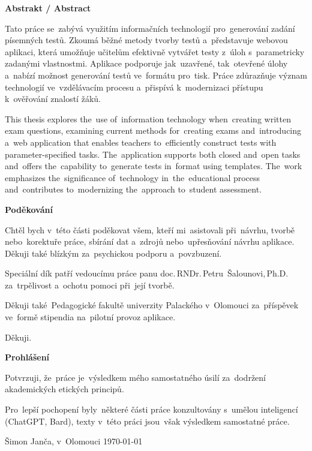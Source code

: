 \documentclass[11pt,a4paper]{report}
\newenvironment{singletonpage}[1]{
    \thispagestyle{empty} %
    \setlength{\parskip}{10pt} %
    \setlength{\parindent}{0pt}
    \vspace*{\stretch{1}} %
    \begin{center}      %
        \textbf{\Huge #1}\\[.4cm]
    \end{center}
}{
    \vspace*{\stretch{3}} %
    \clearpage          %
}
\begin{document}
    \begin{singletonpage}{Abstrakt / Abstract}
    
        Tato práce se~zabývá využitím informačních technologií pro~generování zadání písemných testů. Zkoumá běžné metody tvorby testů a~představuje webovou aplikaci, která umožňuje učitelům efektivně vytvářet testy z~úloh s~parametricky zadanými vlastnostmi. Aplikace podporuje jak~uzavřené, tak~otevřené úlohy a~nabízí možnost generování testů ve~formátu pro~tisk. Práce zdůrazňuje význam technologií ve~vzdělávacím procesu a~přispívá k~modernizaci přístupu k~ověřování znalostí žáků.

        This thesis explores the~use of~information technology when~creating written exam questions, examining current methods for~creating exams and~introducing a~web application that enables teachers to~efficiently construct tests with parameter-specified tasks. The~application supports both closed and~open tasks and~offers the~capability to~generate tests in~format using templates. The~work emphasizes the~significance of~technology in~the~educational process and~contributes to~modernizing the~approach to~student assessment.
    \end{singletonpage}

    \begin{singletonpage}{Poděkování}
    
        Chtěl bych v~této části poděkovat všem, kteří mi~asistovali při~návrhu, tvorbě nebo~korektuře práce, sbírání dat a~zdrojů nebo~upřesňování návrhu aplikace. Děkuji také blízkým za~psychickou podporu a~povzbuzení.
        
        Speciální dík patří vedoucímu práce panu {doc.\,RNDr.\,Petru~Šalounovi,\,Ph.D.} za~trpělivost a~ochotu pomoci při~její tvorbě.
        
        Děkuji také~Pedagogické fakultě univerzity Palackého v~Olomouci za~příspěvek ve~formě stipendia na~pilotní provoz aplikace.

        Děkuji.
    \end{singletonpage}
    
    \begin{singletonpage}{Prohlášení}
    
        Potvrzuji, že~práce je~výsledkem mého samostatného úsilí za~dodržení akademických etických principů.
        
        Pro~lepší pochopení byly~některé části práce konzultovány s~umělou inteligencí (ChatGPT, Bard), texty v~této práci jsou~však výsledkem samostatné práce.

        Šimon Janča, v~Olomouci \today
    \end{singletonpage}
    
\end{document}
